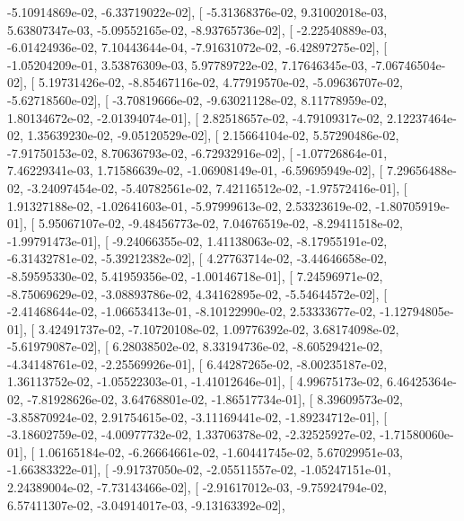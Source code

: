 \documentclass{article}
\begin{document}
         -5.10914869e-02,  -6.33719022e-02],
       [ -5.31368376e-02,   9.31002018e-03,   5.63807347e-03,
         -5.09552165e-02,  -8.93765736e-02],
       [ -2.22540889e-03,  -6.01424936e-02,   7.10443644e-04,
         -7.91631072e-02,  -6.42897275e-02],
       [ -1.05204209e-01,   3.53876309e-03,   5.97789722e-02,
          7.17646345e-03,  -7.06746504e-02],
       [  5.19731426e-02,  -8.85467116e-02,   4.77919570e-02,
         -5.09636707e-02,  -5.62718560e-02],
       [ -3.70819666e-02,  -9.63021128e-02,   8.11778959e-02,
          1.80134672e-02,  -2.01394074e-01],
       [  2.82518657e-02,  -4.79109317e-02,   2.12237464e-02,
          1.35639230e-02,  -9.05120529e-02],
       [  2.15664104e-02,   5.57290486e-02,  -7.91750153e-02,
          8.70636793e-02,  -6.72932916e-02],
       [ -1.07726864e-01,   7.46229341e-03,   1.71586639e-02,
         -1.06908149e-01,  -6.59695949e-02],
       [  7.29656488e-02,  -3.24097454e-02,  -5.40782561e-02,
          7.42116512e-02,  -1.97572416e-01],
       [  1.91327188e-02,  -1.02641603e-01,  -5.97999613e-02,
          2.53323619e-02,  -1.80705919e-01],
       [  5.95067107e-02,  -9.48456773e-02,   7.04676519e-02,
         -8.29411518e-02,  -1.99791473e-01],
       [ -9.24066355e-02,   1.41138063e-02,  -8.17955191e-02,
         -6.31432781e-02,  -5.39212382e-02],
       [  4.27763714e-02,  -3.44646658e-02,  -8.59595330e-02,
          5.41959356e-02,  -1.00146718e-01],
       [  7.24596971e-02,  -8.75069629e-02,  -3.08893786e-02,
          4.34162895e-02,  -5.54644572e-02],
       [ -2.41468644e-02,  -1.06653413e-01,  -8.10122990e-02,
          2.53333677e-02,  -1.12794805e-01],
       [  3.42491737e-02,  -7.10720108e-02,   1.09776392e-02,
          3.68174098e-02,  -5.61979087e-02],
       [  6.28038502e-02,   8.33194736e-02,  -8.60529421e-02,
         -4.34148761e-02,  -2.25569926e-01],
       [  6.44287265e-02,  -8.00235187e-02,   1.36113752e-02,
         -1.05522303e-01,  -1.41012646e-01],
       [  4.99675173e-02,   6.46425364e-02,  -7.81928626e-02,
          3.64768801e-02,  -1.86517734e-01],
       [  8.39609573e-02,  -3.85870924e-02,   2.91754615e-02,
         -3.11169441e-02,  -1.89234712e-01],
       [ -3.18602759e-02,  -4.00977732e-02,   1.33706378e-02,
         -2.32525927e-02,  -1.71580060e-01],
       [  1.06165184e-02,  -6.26664661e-02,  -1.60441745e-02,
          5.67029951e-03,  -1.66383322e-01],
       [ -9.91737050e-02,  -2.05511557e-02,  -1.05247151e-01,
          2.24389004e-02,  -7.73143466e-02],
       [ -2.91617012e-03,  -9.75924794e-02,   6.57411307e-02,
         -3.04914017e-03,  -9.13163392e-02],
\end{document}

